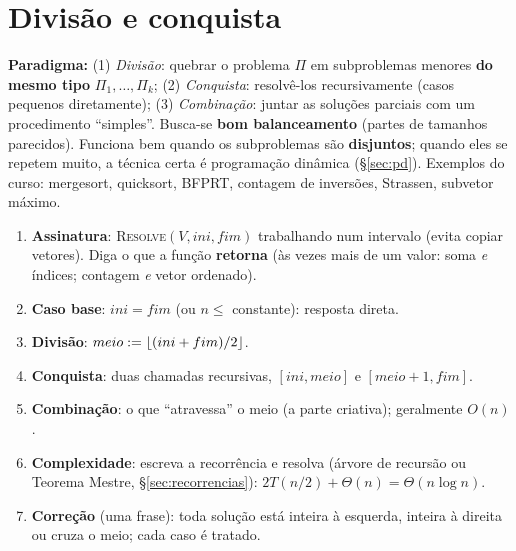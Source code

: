 \section{Divisão e conquista}\label{sec:dc}
\textbf{Paradigma:} (1) \emph{Divisão}: quebrar o problema $\Pi$ em subproblemas menores \textbf{do mesmo tipo} $\Pi_1,\dots,\Pi_k$; (2) \emph{Conquista}: resolvê-los recursivamente (casos pequenos diretamente); (3) \emph{Combinação}: juntar as soluções parciais com um procedimento ``simples''. Busca-se \textbf{bom balanceamento} (partes de tamanhos parecidos). Funciona bem quando os subproblemas são \textbf{disjuntos}; quando eles se repetem muito, a técnica certa é programação dinâmica (§\ref{sec:pd}).
Exemplos do curso: mergesort, quicksort, BFPRT, contagem de inversões, Strassen, subvetor máximo.

\begin{prova}
\begin{enumerate}
  \item \textbf{Assinatura}: \textsc{Resolve}$(V,ini,fim)$ trabalhando num intervalo (evita copiar vetores). Diga o que a função \textbf{retorna} (às vezes mais de um valor: soma \emph{e} índices; contagem \emph{e} vetor ordenado).
  \item \textbf{Caso base}: $ini=fim$ (ou $n\le$ constante): resposta direta.
  \item \textbf{Divisão}: $meio:=\lfloor(ini+fim)/2\rfloor$.
  \item \textbf{Conquista}: duas chamadas recursivas, $[ini,meio]$ e $[meio+1,fim]$.
  \item \textbf{Combinação}: o que ``atravessa'' o meio (a parte criativa); geralmente $O(n)$.
  \item \textbf{Complexidade}: escreva a recorrência e resolva (árvore de recursão ou Teorema Mestre, §\ref{sec:recorrencias}): $2T(n/2)+\Theta(n)=\Theta(n\log n)$.
  \item \textbf{Correção} (uma frase): toda solução está inteira à esquerda, inteira à direita ou cruza o meio; cada caso é tratado.
\end{enumerate}
\end{prova}

